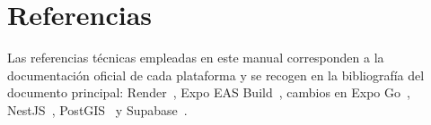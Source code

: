 \section{Referencias}

Las referencias técnicas empleadas en este manual corresponden a la documentación oficial de cada plataforma y se recogen en la bibliografía del documento principal: Render~\cite{render}, Expo EAS Build~\cite{expoeas}, cambios en Expo Go~\cite{expoGoLoading2026}, NestJS~\cite{nestjs}, PostGIS~\cite{postgisdocs} y Supabase~\cite{supabase}.
